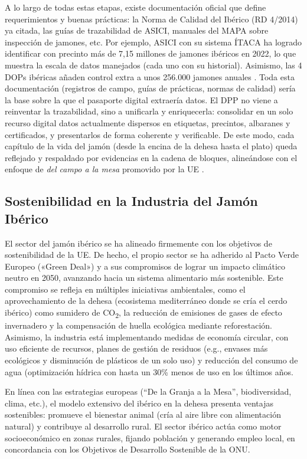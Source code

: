 A lo largo de todas estas etapas, existe documentación oficial que define requerimientos y buenas prácticas: la Norma de Calidad del Ibérico (RD 4/2014) ya citada, las guías de trazabilidad de ASICI, manuales del MAPA sobre inspección de jamones, etc. Por ejemplo, ASICI con su sistema ÍTACA ha logrado identificar con precinto más de 7,15 millones de jamones ibéricos en 2022, lo que muestra la escala de datos manejados (cada uno con su historial). Asimismo, las 4 DOPs ibéricas añaden control extra a  unos 256.000 jamones anuales \cite{asociacion_interprofesional_del_cerdo_iberico_asici_despierta_2023}. Toda esta documentación (registros de campo, guías de prácticas, normas de calidad) sería la base sobre la que el pasaporte digital extraería datos. El DPP no viene a reinventar la trazabilidad, sino a unificarla y enriquecerla: consolidar en un solo recurso digital datos actualmente dispersos en etiquetas, precintos, albaranes y certificados, y presentarlos de forma coherente y verificable. De este modo, cada capítulo de la vida del jamón (desde la encina de la dehesa hasta el plato) queda reflejado y respaldado por evidencias en la cadena de bloques, alineándose con el enfoque de \textit{del campo a la mesa} promovido por la UE \cite{noauthor_farm_nodate}.

\subsection{Sostenibilidad en la Industria del Jamón Ibérico}
El sector del jamón ibérico se ha alineado firmemente con los objetivos de sostenibilidad de la UE. De hecho, el propio sector se ha adherido al Pacto Verde Europeo («Green Deal») y a sus compromisos de lograr un impacto climático neutro en 2050, avanzando hacia un sistema alimentario más sostenible. Este compromiso se refleja en múltiples iniciativas ambientales, como el aprovechamiento de la dehesa (ecosistema mediterráneo donde se cría el cerdo ibérico) como sumidero de CO\textsubscript{2}, la reducción de emisiones de gases de efecto invernadero y la compensación de huella ecológica mediante reforestación. Asimismo, la industria está implementando medidas de economía circular, con uso eficiente de recursos, planes de gestión de residuos (e.g., envases más ecológicos y disminución de plásticos de un solo uso) y reducción del consumo de agua (optimización hídrica con hasta un 30\% menos de uso en los últimos años.

En línea con las estrategias europeas (“De la Granja a la Mesa”, biodiversidad, clima, etc.), el modelo extensivo del ibérico en la dehesa presenta ventajas sostenibles: promueve el bienestar animal (cría al aire libre con alimentación natural) y contribuye al desarrollo rural. El sector ibérico actúa como motor socioeconómico en zonas rurales, fijando población y generando empleo local, en concordancia con los Objetivos de Desarrollo Sostenible de la ONU.

